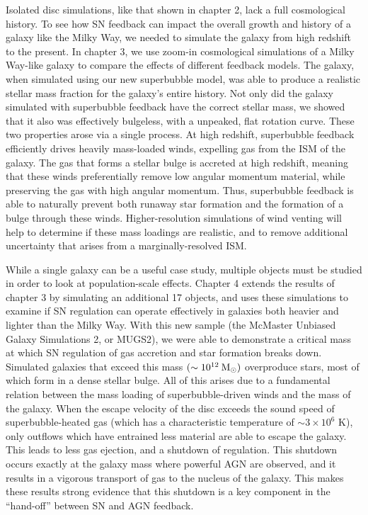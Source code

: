 Isolated disc simulations, like that shown in chapter 2, lack a full
cosmological history.  To see how SN feedback can impact the overall growth and
history of a galaxy like the Milky Way, we needed to simulate the galaxy from
high redshift to the present.  In chapter 3, we use zoom-in cosmological
simulations \citep{Navarro1993} of a Milky Way-like galaxy to compare the
effects of different feedback models.  The galaxy, when simulated using our new
superbubble model, was able to produce a realistic stellar mass fraction for the
galaxy's entire history.  Not only did the galaxy simulated with superbubble
feedback have the correct stellar mass, we showed that it also was effectively
bulgeless, with a unpeaked, flat rotation curve.  These two properties arose
via a single process.  At high redshift, superbubble feedback efficiently drives
heavily mass-loaded winds, expelling gas from the ISM of the galaxy.  The gas
that forms a stellar bulge is accreted at high redshift, meaning that these
winds preferentially remove low angular momentum material, while preserving the
gas with high angular momentum.  Thus, superbubble feedback is able to naturally
prevent both runaway star formation and the formation of a bulge through these
winds.  Higher-resolution simulations of wind venting will help to determine if
these mass loadings are realistic, and to remove additional uncertainty that
arises from a marginally-resolved ISM.  

While a single galaxy can be a useful case study, multiple objects must be
studied in order to look at population-scale effects.  Chapter 4 extends the
results of chapter 3 by simulating an additional 17 objects, and uses these
simulations to examine if SN regulation can operate effectively in galaxies both
heavier and lighter than the Milky Way.  With this new sample (the McMaster
Unbiased Galaxy Simulations 2, or MUGS2), we were able to demonstrate a critical
mass at which SN regulation of gas accretion and star formation breaks down.
Simulated galaxies that exceed this mass $(\sim 10^{12}\>{\rm M_{\odot}})$ overproduce
stars,  most of which form in a dense stellar bulge.  All of this arises due to
a fundamental relation between the mass loading of superbubble-driven winds and
the mass of the galaxy.  When the escape velocity of the disc exceeds the sound
speed of superbubble-heated gas (which has a characteristic temperature of
$\sim3\times10^6$ K), only outflows which have entrained less material are able
to escape the galaxy. This leads to less gas ejection, and a shutdown of
regulation.  This shutdown occurs exactly at the galaxy mass where powerful AGN
are observed, and it results in a vigorous transport of gas to the nucleus of
the galaxy.  This makes these results strong evidence that this shutdown is a key
component in the ``hand-off'' between SN and AGN feedback.

